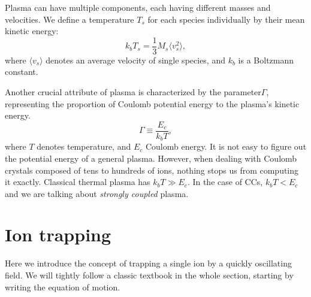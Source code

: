 Plasma can have multiple components, each having different masses and velocities. We define a temperature $T_s$ \cite{fitzpatrick2014plasma} for each species individually by their mean kinetic energy:
\begin{equation}
	\label{temperature}
	k_b T_s = \frac{1}{3} M_s \langle v_s^2 \rangle,
\end{equation}
where $\langle v_s \rangle$ denotes an average velocity of single species, and $k_b$ is a Boltzmann constant.

Another crucial attribute of plasma is characterized by the parameter$\Gamma$, representing the proportion of Coulomb potential energy to the plasma's kinetic energy.
\begin{equation}
	\label{gamma def}
	\Gamma \equiv \frac{E_c}{k_b T},
\end{equation}
where $T$ denotes temperature, and $E_c$ Coulomb energy. It is not easy to figure out the potential energy of a general plasma. However, when dealing with Coulomb crystals composed of tens to hundreds of ions, nothing stops us from computing it exactly. Classical thermal plasma has $k_b T \gg E_c$. In the case of CCs, $k_b T < E_c$ and we are talking about \emph{strongly coupled} plasma.

\section{Ion trapping}
Here we introduce the concept of trapping a single ion by a quickly oscillating field. We will tightly follow a classic textbook \cite{gerlich1992inhomogeneous} in the whole section, starting by writing the equation of motion.

